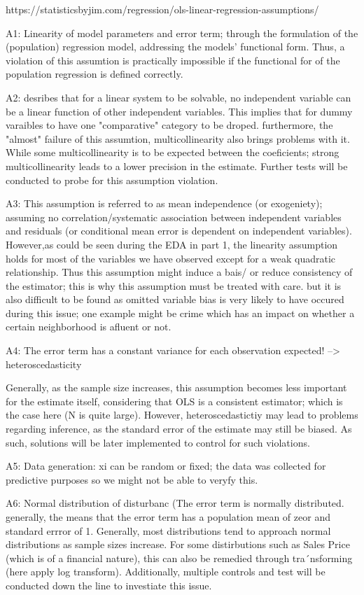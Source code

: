 \documentclass{article}
\begin{document}
https://statisticsbyjim.com/regression/ols-linear-regression-assumptions/

A1: Linearity of model parameters and error term; through the formulation of the (population) regression model, addressing the models' functional form. Thus, a violation of this assumtion is practically impossible if the functional for of the population regression is defined correctly. 

A2: desribes that for a linear system to be solvable, no independent variable can be a linear function of other independent variables. This implies that for dummy varaibles to have one "comparative" category to be droped. furthermore, the "almost" failure of this assumtion, multicollinearity also brings problems with it. While some multicollinearity is to be expected between the coeficients; strong multicollinearity leads to a lower precision in the estimate. Further tests will be conducted to probe for this assumption violation. 

A3: This assumption is referred to as mean independence (or exogeniety); assuming no correlation/systematic association between independent variables and residuals (or conditional mean error is dependent on independent variables). However,as could be seen during the EDA in part 1, the linearity assumption holds for most of the variables we have observed except for a weak quadratic relationship. 
Thus this assumption might induce a bais/ or reduce consistency of the estimator; this is why this assumption must be treated with care. but it is also difficult to be found as omitted variable bias is very likely to have occured during this issue; one example might be crime which has an impact on whether a certain neighborhood is afluent or not.

A4: The error term has a constant variance for each observation expected! --> heteroscedasticity

Generally, as the sample size increases, this assumption becomes less important for the estimate itself, considering that OLS is a consistent estimator; which is the case here (N is quite large). However, heteroscedastictiy may lead to problems regarding inference, as the standard error of the estimate may still be biased. As such, solutions will be later implemented to control for such violations.


A5: Data generation: xi can be random or fixed; the data was collected for predictive purposes so we might not be able to veryfy this.

A6: Normal distribution of disturbanc (The error term is normally distributed. generally, the means that the error term has a population mean of zeor and standard errror of 1. Generally, most distributions tend to approach normal distributions as sample sizes increase. For some distirbutions such as Sales Price (which is of a financial nature), this can also be remedied through tra´nsforming (here apply log transform). Additionally, multiple controls and test will be conducted down the line to investiate this issue.
\end{document}
